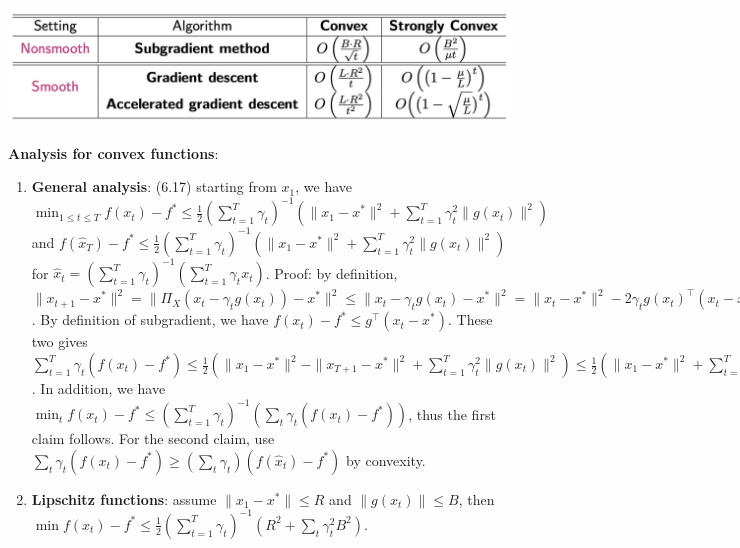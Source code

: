 \includegraphics[width=\linewidth]{imgs/subGD.jpg}

\textbf{Analysis for convex functions}:
\begin{enumerate}
    \item \textbf{General analysis}: (6.17) starting from $x_1$, we have $\min_{1\le t\le T} f(x_t) - f^* \le \frac{1}{2}(\sum_{t=1}^T \gamma_t)^{-1}(\|x_1 - x^*\|^2 + \sum_{t=1}^T \gamma_t^2\|g(x_t)\|^2)$ and $f(\hat{x}_T) - f^* \le \frac{1}{2}(\sum_{t=1}^T \gamma_t)^{-1}(\|x_1 - x^*\|^2 + \sum_{t=1}^T \gamma_t^2\|g(x_t)\|^2)$ for $\hat{x}_t=(\sum_{t=1}^T \gamma_t)^{-1}(\sum_{t=1}^T \gamma_t x_t)$. Proof: by definition, $\|x_{t+1} - x^*\|^2 = \|\Pi_X(x_t - \gamma_t g(x_t)) - x^*\|^2 \le \|x_t - \gamma_t g(x_t) - x^*\|^2 = \|x_t - x^*\|^2 - 2\gamma_t g(x_t)^\top (x_t - x^*) + \gamma_t^2\|g(x_t)\|^2$. By definition of subgradient, we have $f(x_t) - f^* \le g^\top (x_t - x^*)$. These two gives $\sum_{t=1}^T \gamma_t (f(x_t) - f^*) \le \frac{1}{2}(\|x_1 - x^*\|^2 - \|x_{T+1} - x^*\|^2 + \sum_{t=1}^T \gamma_t^2\|g(x_t)\|^2) \le \frac{1}{2}(\|x_1 - x^*\|^2 + \sum_{t=1}^T \gamma_t^2\|g(x_t)\|^2)$. In addition, we have $\min_{t} f(x_t) - f^* \le (\sum_{t=1}^T \gamma_t)^{-1} (\sum_t \gamma_t (f(x_t) - f^*))$, thus the first claim follows. For the second claim, use $\sum_t \gamma_t (f(x_t) - f^*) \ge (\sum_t \gamma_t) (f(\hat{x}_t) - f^*)$ by convexity.
    \item \textbf{Lipschitz functions}: assume $\|x_1 - x^*\| \le R$ and $\|g(x_t)\| \le B$, then $\min f(x_t) - f^* \le \frac{1}{2}(\sum_{t=1}^T \gamma_t)^{-1} (R^2 + \sum_t \gamma_t^2 B^2)$.
\end{enumerate}

